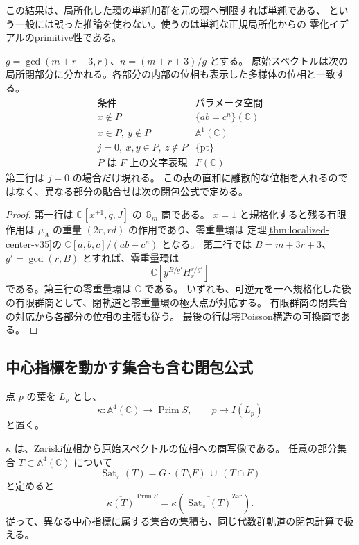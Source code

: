 この結果は、局所化した環の単純加群を元の環へ制限すれば単純である、
という一般には誤った推論を使わない。使うのは単純な正規局所化からの
零化イデアルのprimitive性である。

\begin{corollary}[全正共鳴の原始スペクトルの層別]
\label{cor:primitive-strata-v37}
$g=\gcd(m+r+3,r)$、$n=(m+r+3)/g$ とする。
原始スペクトルは次の局所閉部分に分かれる。各部分の内部の位相も表示した多様体の位相と一致する。
\[
\begin{array}{c|c}
 \text{条件}&\text{パラメータ空間}\\\hline
 x\notin P&\{ab=c^n\}(\mathbb C)\\
 x\in P,\ y\notin P&\mathbb A^1(\mathbb C)\\
 j=0,\ x,y\in P,\ z\notin P&\{\mathrm{pt}\}\\
 P\text{ は }F\text{ 上の文字表現}&F(\mathbb C)
\end{array}
\]
第三行は $j=0$ の場合だけ現れる。
この表の直和に離散的な位相を入れるのではなく、異なる部分の貼合せは次の閉包公式で定める。
\end{corollary}

\begin{proof}
第一行は $\mathbb C[x^{\pm1},q,J]$ の $\mathbb G_m$ 商である。
$x=1$ と規格化すると残る有限作用は
$\mu_A$ の重量 $(2r,rd)$ の作用であり、零重量環は
定理\ref{thm:localized-center-v35}の $\mathbb C[a,b,c]/(ab-c^n)$ となる。
第二行では $B=m+3r+3$、$g'=\gcd(r,B)$ とすれば、零重量環は
\[
 \mathbb C[y^{B/g'}H_r^{r/g'}]
\]
である。第三行の零重量環は $\mathbb C$ である。
いずれも、可逆元を一へ規格化した後の有限群商として、閉軌道と零重量環の極大点が対応する。
有限群商の閉集合の対応から各部分の位相の主張も従う。
最後の行は零Poisson構造の可換商である。
\end{proof}

\subsection{中心指標を動かす集合も含む閉包公式}

点 $p$ の葉を $L_p$ とし、
\[
 \kappa:\mathbb A^4(\mathbb C)\longrightarrow\operatorname{Prim}S,
 \qquad p\longmapsto I(\overline{L_p})
\]
と置く。

\begin{theorem}[全域的な閉包位相]
\label{thm:global-leaf-closure-v37}
$\kappa$ は、Zariski位相から原始スペクトルの位相への商写像である。
任意の部分集合 $T\subset\mathbb A^4(\mathbb C)$ について
\[
 \operatorname{Sat}_\pi(T)=G\cdot(T\setminus F)\ \cup\ (T\cap F)
\]
と定めると
\[
 \boxed{\quad
 \overline{\kappa(T)}^{\operatorname{Prim}S}
 =\kappa\!\left(\overline{\operatorname{Sat}_\pi(T)}^{\mathrm{Zar}}\right).
 \quad}
\]
従って、異なる中心指標に属する集合の集積も、同じ代数群軌道の閉包計算で扱える。
\end{theorem}

